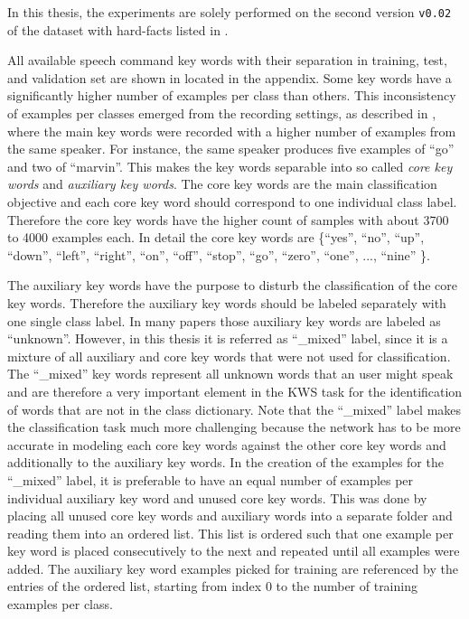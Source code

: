 In this thesis, the experiments are solely performed on the second version \texttt{v0.02} of the dataset with hard-facts listed in .

All available speech command key words with their separation in training, test, and validation set are shown in  located in the appendix.
Some key words have a significantly higher number of examples per class than others.
This inconsistency of examples per classes emerged from the recording settings, as described in \cite{Warden2018}, where the main key words were recorded with a higher number of examples from the same speaker.
For instance, the same speaker produces five examples of \enquote{go} and two of \enquote{marvin}.
This makes the key words separable into so called \emph{core key words} and \emph{auxiliary key words}.
The core key words are the main classification objective and each core key word should correspond to one individual class label.
Therefore the core key words have the higher count of samples with about 3700 to 4000 examples each.
In detail the core key words are \{\enquote{yes}, \enquote{no}, \enquote{up}, \enquote{down}, \enquote{left}, \enquote{right}, \enquote{on}, \enquote{off}, \enquote{stop}, \enquote{go}, \enquote{zero}, \enquote{one}, ..., \enquote{nine} \}.

The auxiliary key words have the purpose to disturb the classification of the core key words.
Therefore the auxiliary key words should be labeled separately with one single class label.
In many papers those auxiliary key words are labeled as \enquote{unknown}.
However, in this thesis it is referred as \enquote{\_mixed} label, since it is a mixture of all auxiliary and core key words that were not used for classification.
The \enquote{\_mixed} key words represent all unknown words that an user might speak and are therefore a very important element in the KWS task for the identification of words that are not in the class dictionary.
Note that the \enquote{\_mixed} label makes the classification task much more challenging because the network has to be more accurate in modeling each core key words against the other core key words and additionally to the auxiliary key words.
In the creation of the examples for the \enquote{\_mixed} label, it is preferable to have an equal number of examples per individual auxiliary key word and unused core key words.
This was done by placing all unused core key words and auxiliary words into a separate folder and reading them into an ordered list.
This list is ordered such that one example per key word is placed consecutively to the next and repeated until all examples were added.
The auxiliary key word examples picked for training are referenced by the entries of the ordered list, starting from index 0 to the number of training examples per class.

